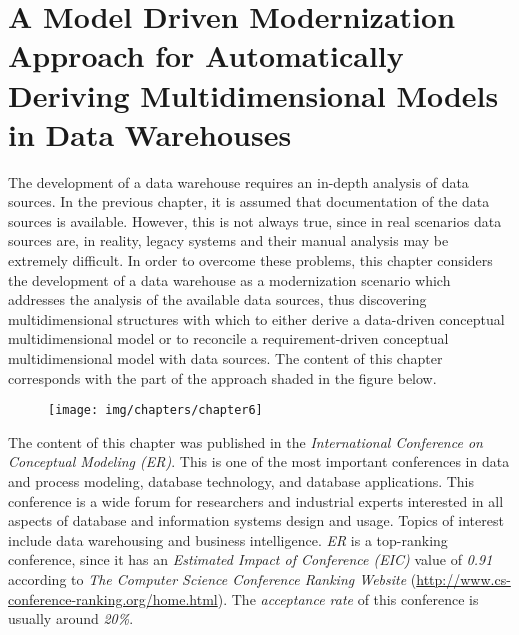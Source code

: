 %
%
%



\chapter{A Model Driven Modernization Approach for Automatically Deriving Multidimensional Models in Data Warehouses}
\label{c6} %

The development of a data warehouse requires an in-depth analysis of
data sources. In the previous chapter, it is assumed that
documentation of the data sources is available. However, this is not
always true, since in real scenarios data sources are, in reality,
legacy systems and their manual analysis may be extremely difficult.
In order to overcome these problems, this chapter considers the
development of a data warehouse as a modernization scenario which
addresses the analysis of the available data sources, thus
discovering multidimensional structures with which to either derive
a data-driven conceptual multidimensional model or to reconcile a
requirement-driven conceptual multidimensional model with data
sources. The content of this chapter corresponds with the part of
the approach shaded in the figure below.

\begin{figure}[h!]
  \begin{center}
    \texttt{[image: img/chapters/chapter6]}
  \end{center}
\end{figure}


The content of this chapter was published in the \emph{International
Conference on Conceptual Modeling (ER)}. This is one of the  most
important conferences in data and process modeling, database
technology, and database applications. This conference is a wide
forum for researchers and industrial experts interested in all
aspects of database and information systems design and usage. Topics
of interest include data warehousing and business intelligence.
\emph{ER} is a top-ranking conference, since it has an
\emph{Estimated Impact of Conference (EIC)} value of \emph{0.91}
according to \emph{The Computer Science Conference Ranking Website}
(\url{http://www.cs-conference-ranking.org/home.html}). The
\emph{acceptance rate} of this conference is usually around
\emph{20\%}.



%
